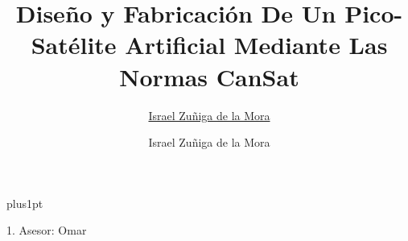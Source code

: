 \documentclass[twoside,11pt]{Latex/Classes/PhDthesisPSnPDF}
\title{Dise\~{n}o y Fabricaci\'{o}n De Un Pico-Sat\'{e}lite Artificial Mediante Las Normas CanSat}
\author{\href{mailto:israelzuniga@ucol.mx}{Israel Zu\~{n}iga de la Mora}}
\author{Israel Zu\~{n}iga de la Mora}
\begin{document}

\renewcommand\baselinestretch{1.2}
\baselineskip=18pt plus1pt



\maketitle  %



\vspace{10mm}
1. Asesor: Omar








%

%   




\frontmatter




\end{document}
